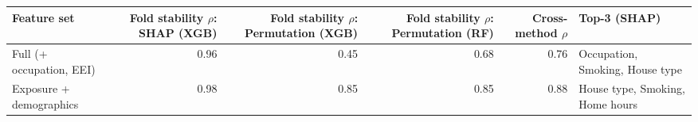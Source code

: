 \begin{tabular}{lrrrrl}
\toprule
Feature set & Fold stability $\rho$: SHAP (XGB) & Fold stability $\rho$: Permutation (XGB) & Fold stability $\rho$: Permutation (RF) & Cross-method $\rho$ & Top-3 (SHAP) \\
\midrule
Full (+ occupation, EEI) & 0.96 & 0.45 & 0.68 & 0.76 & Occupation, Smoking, House type \\
Exposure + demographics & 0.98 & 0.85 & 0.85 & 0.88 & House type, Smoking, Home hours \\
\bottomrule
\end{tabular}
